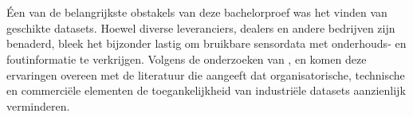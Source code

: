 



\section{}%
\label{sec: reflectie}

Éen van de belangrijkste obstakels van deze bachelorproef was het vinden van geschikte datasets. Hoewel diverse leveranciers, dealers en andere bedrijven zijn benaderd, bleek het bijzonder lastig om bruikbare sensordata met onderhouds- en foutinformatie te verkrijgen. Volgens de onderzoeken van \textcite{Elahi2023}, \textcite{Hu2024} en \textcite{Wang2025} komen deze ervaringen overeen met de literatuur die aangeeft dat organisatorische, technische en commerciële elementen de toegankelijkheid van industriële datasets aanzienlijk verminderen.

